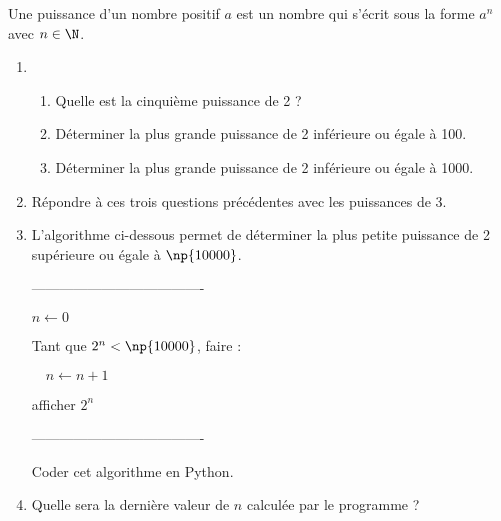 
Une puissance d'un nombre positif $a$ est un nombre qui s'écrit sous la forme $a^n$ avec $n \in \N$.

\begin{enumerate}
\item 
\begin{enumerate}
\item Quelle est la cinquième puissance de 2 ?
\item Déterminer la plus grande puissance de 2 inférieure ou égale à 100. 
\item Déterminer la plus grande puissance de 2 inférieure ou égale à 1000.  
\end{enumerate}
\item Répondre à ces trois questions précédentes avec les puissances de 3.
\item L'algorithme ci-dessous permet de déterminer la plus petite puissance de 2 supérieure ou égale à $\np{10000}$.

-------------------------------------

$n \longleftarrow 0$

Tant que $2^n < \np{10000}$, faire :

$\quad n \longleftarrow n+1$

afficher $2^n$

-------------------------------------

Coder cet algorithme en Python.
\item Quelle sera la dernière valeur de $n$ calculée par le programme ?
\end{enumerate}